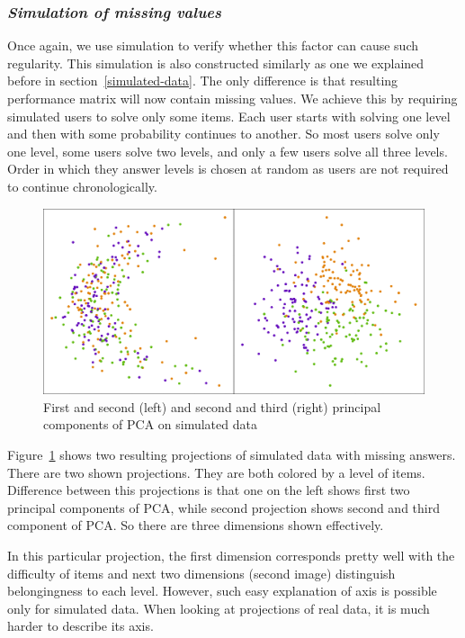 \documentclass[
  printed, %
  table,   %
  nolof,     %
  nolot,     %
  color,
  final,
  nocover
]{fithesis3}
\begin{document}

\subsubsection{\textit{Simulation of missing values}}\label{simulation-of-missing-values}

Once again, we use simulation to verify whether this factor can cause such regularity. This simulation is also constructed similarly as one we explained before in section~\ref{simulated-data}. The only difference is that resulting performance matrix will now contain missing values. We achieve this by requiring simulated users to solve only some items. Each user starts with solving one level and then with some probability continues to another. So most users solve only one level, some users solve two levels, and only a few users solve all three levels. Order in which they answer levels is chosen at random as users are not required to continue chronologically.

\begin{figure}
  \includegraphics[width=\textwidth]{img/simulated_missing}
  \caption{First and second (left) and second and third (right) principal components of PCA on simulated data}
  \label{fig:simulated_missing}
\end{figure}

Figure~\ref{fig:simulated_missing} shows two resulting projections of simulated data with missing answers. There are two shown projections. They are both colored by a level of items. Difference between this projections is that one on the left shows first two principal components of PCA, while second projection shows second and third component of PCA. So there are three dimensions shown effectively.

In this particular projection, the first dimension corresponds pretty well with the difficulty of items and next two dimensions (second image) distinguish belongingness to each level. However, such easy explanation of axis is possible only for simulated data. When looking at projections of real data, it is much harder to describe its axis.
\end{document}
